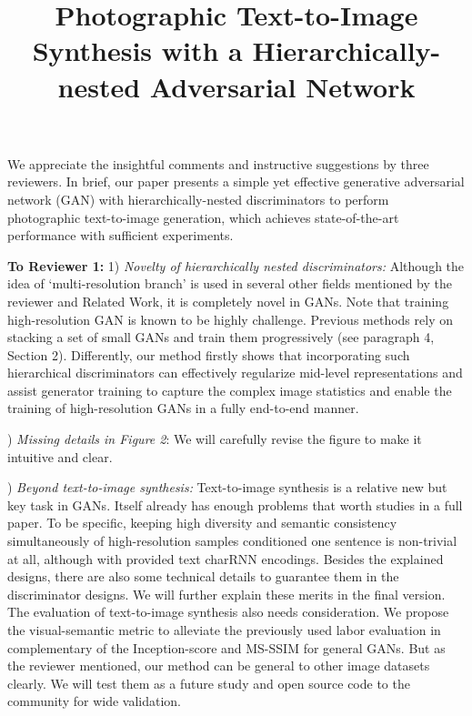 \documentclass[10pt,twocolumn,letterpaper]{article}
\begin{document}
\title{Photographic Text-to-Image Synthesis with a Hierarchically-nested Adversarial Network}  %

\maketitle
\thispagestyle{empty}

\noindent
We appreciate the insightful comments and instructive suggestions by three reviewers. In brief, our paper presents a simple yet effective generative adversarial network (GAN) with hierarchically-nested discriminators to perform photographic text-to-image generation, which achieves state-of-the-art performance with sufficient experiments.

\noindent
\textbf{To Reviewer 1:} 1) \textit{Novelty of hierarchically nested discriminators:} Although the idea of `multi-resolution branch' is used in several other fields mentioned by the reviewer and Related Work, it is completely novel in GANs. Note that training high-resolution GAN is known to be highly challenge. Previous methods rely on stacking a set of small GANs and train them progressively (see paragraph 4, Section 2). Differently, our method firstly shows that incorporating such hierarchical discriminators can effectively regularize mid-level representations and assist generator training to capture the complex image statistics and enable the training of high-resolution GANs in a fully end-to-end manner.

) \textit{Missing details in Figure 2}: We will carefully revise the figure to make it intuitive and clear.

) \textit{Beyond text-to-image synthesis:} Text-to-image synthesis is a relative new but key task in GANs. Itself already has enough problems that worth studies in a full paper. To be specific, keeping high diversity and semantic consistency simultaneously of high-resolution samples conditioned one sentence is non-trivial at all, although with provided text charRNN encodings. Besides the explained designs, there are also some technical details to guarantee them in the discriminator designs. We will further explain these merits in the final version. The evaluation of text-to-image synthesis also needs consideration.
We propose the visual-semantic metric to alleviate the previously used labor evaluation in complementary of the Inception-score and MS-SSIM for general GANs. But as the reviewer mentioned, our method can be general to other image datasets clearly. We will test them as a future study and open source code to the community for wide validation.
\end{document}
